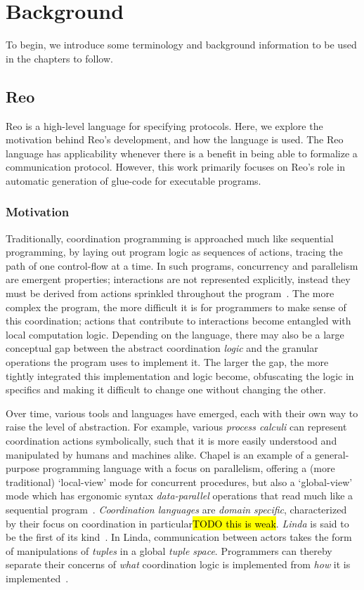 
\chapter{Background}
\label{sec:background}
To begin, we introduce some terminology and background information to be used in the chapters to follow.

\section{Reo}
\label{sec:reo_background}
Reo is a high-level language for specifying protocols. Here, we explore the motivation behind Reo's development, and how the language is used.
The Reo language has applicability whenever there is a benefit in being able to formalize a communication protocol. However, this work primarily focuses on Reo's role in automatic generation of glue-code for executable programs.  

\subsection{Motivation}
\label{sec:reo_motivation}
Traditionally, coordination programming is approached much like sequential programming, by laying out program logic as sequences of actions, tracing the path of one control-flow at a time. In such programs, concurrency and parallelism are emergent properties; interactions are not represented explicitly, instead they must be derived from actions sprinkled throughout the program~\cite{arbab2011puff}. The more complex the program, the more difficult it is for programmers to make sense of this coordination; actions that contribute to interactions become entangled with local computation logic. Depending on the language, there may also be a large conceptual gap between the abstract coordination \textit{logic} and the granular operations the program uses to implement it. The larger the gap, the more tightly integrated this implementation and logic become, obfuscating the logic in specifics and making it difficult to change one without changing the other.

Over time, various tools and languages have emerged, each with their own way to raise the level of abstraction. For example, various \textit{process calculi} can represent coordination actions symbolically, such that it is more easily understood and manipulated by humans and machines alike. Chapel is an example of a general-purpose programming language with a focus on parallelism, offering a (more traditional) `local-view' mode for concurrent procedures, but also a `global-view' mode which has ergonomic syntax \textit{data-parallel} operations that read much like a sequential program~\cite{chamberlain2007parallel}.
\textit{Coordination languages} are \textit{domain specific}, characterized by their focus on coordination in particular\hl{TODO this is weak}. \textit{Linda} is said to be the first of its kind~\cite{wells2005coordination}. In Linda, communication between actors takes the form of manipulations of \textit{tuples} in a global \textit{tuple space}. Programmers can thereby separate their concerns of \textit{what} coordination logic is implemented from \textit{how} it is implemented~\cite{gelernter1992coordination}.

